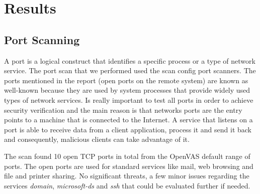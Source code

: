 \section{Results}

\subsection{Port Scanning}

A port is a logical construct that identifies a specific process or a type of network service. The port scan that we performed used the scan config port scanners. The ports mentioned in the report (open ports on the remote system) are known as well-known because they are used by system processes that provide widely used types of network services. Is really important to test all ports in order to achieve security verification and the  main reason is that networks ports are the entry points to a machine that is connected to the Internet. A service that listens on a port is able to receive data from a client application, process it and send it back and consequently, malicious clients can take advantage of it.

The scan found 10 open TCP ports in total from the OpenVAS default range of ports. The open ports are used for standard services like mail, web browsing and file and printer sharing. No significant threats, a few minor issues regarding the services \textit{domain}, \textit{microsoft-ds} and \textit{ssh} that could be evaluated further if needed.


